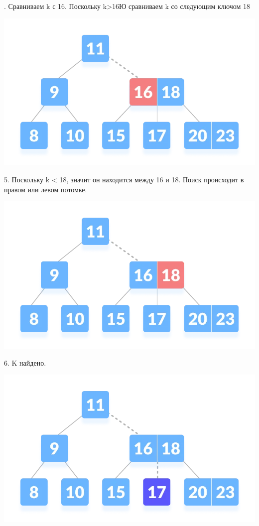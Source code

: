         .	Сравниваем k с 16. Поскольку k>16Ю сравниваем k со следующим ключом 18 \par
        \includegraphics[width=0.6\linewidth]{search-4.jpg} \par
        5.	Поскольку k < 18, значит он находится между 16 и 18. Поиск происходит в правом или левом потомке. \par
        \includegraphics[width=0.6\linewidth]{search-5.jpg} \par
        6.	K найдено. \par
        \includegraphics[width=0.6\linewidth]{search-6.jpg} \par
        \newpage
